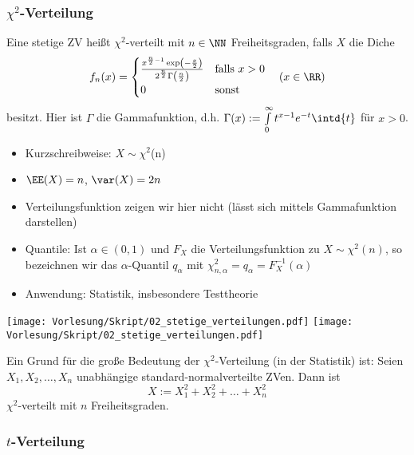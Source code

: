 \documentclass{scrreprt}
\begin{document}
\subsubsection{\texorpdfstring{$ \chi^2 $}{Chi-Quadrat}-Verteilung}

 Eine stetige ZV heißt $ \chi^2 $-verteilt mit $ n \in \NN $ Freiheitsgraden, falls $ X $ die Diche 
$$f_n(x)=\begin{cases}
\frac{x^{\frac{n}{2}-1}\exp\left(-\frac{x}{2}\right)}{2^{\frac{n}{2}}\Gamma\left(\frac{n}{2}\right)} & \text{falls }x>0\\
0 & \text{sonst}
\end{cases} \quad (x\in \RR)$$
besitzt. Hier ist $\Gamma$ die Gammafunktion, d.h. $\Gamma(x):= \int\limits_{0}^{\infty}t^{x-1}e^{-t}\intd{t}$ für $x>0$.

\begin{itemize}
	\item Kurzschreibweise: $X\sim \chi^{2}$(n)
	\item $\EE(X)=n$, $\var(X)=2n$
	\item Verteilungsfunktion zeigen wir hier nicht (lässt sich mittels Gammafunktion darstellen)
	\item Quantile: Ist $\alpha\in (0,1)$ und $F_X$ die Verteilungsfunktion zu $X \sim \chi^{2}(n)$, so bezeichnen wir das $\alpha$-Quantil $q_\alpha$ mit $\chi^{2}_{n,\alpha}=q_{\alpha}=F_X^{-1}(\alpha)$
	\item Anwendung: Statistik, insbesondere Testtheorie
\end{itemize}

\begin{center}
\texttt{[image: Vorlesung/Skript/02\_stetige\_verteilungen.pdf]}
\texttt{[image: Vorlesung/Skript/02\_stetige\_verteilungen.pdf]}
\end{center}

Ein Grund für die große Bedeutung der $ \chi^2 $-Verteilung (in der Statistik) ist:
 Seien $ X_1, X_2, \ldots, X_n $ unabhängige standard-normalverteilte ZVen. Dann ist 
$$ X:=X_1^{2} + X_2^{2}+\ldots + X_n^{2} $$
$ \chi^{2} $-verteilt mit $ n $ Freiheitsgraden.

\subsubsection{\texorpdfstring{$ t $}{t}-Verteilung}
\end{document}

